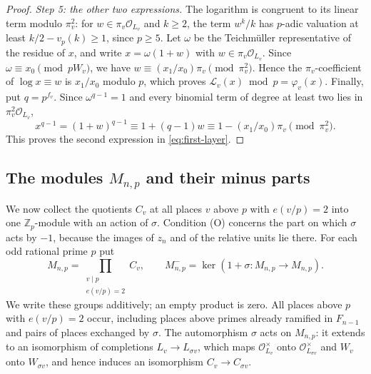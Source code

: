 \documentclass[11pt]{article}
\theoremstyle{plain}
\theoremstyle{definition}
\theoremstyle{remark}
\newcommand{\Z}{\mathbb Z}
\newcommand{\OO}{\mathcal O}
\begin{document}
\begin{proof}
\emph{Step 5: the other two expressions.}  The logarithm is congruent to
its linear term modulo $\pi_v^2$: for $w\in\pi_v\OO_{L_v}$ and $k\ge2$,
the term $w^k/k$ has $p$-adic valuation at least $k/2-v_p(k)\ge1$, since
$p\ge5$.  Let $\omega$ be the Teichm\"uller representative of the residue
of $x$, and write $x=\omega(1+w)$ with $w\in\pi_v\OO_{L_v}$.  Since
$\omega\equiv x_0\pmod{pW_v}$, we have
$w\equiv(x_1/x_0)\pi_v\pmod{\pi_v^2}$.  Hence the $\pi_v$-coefficient of
$\log x\equiv w$ is $x_1/x_0$ modulo $p$, which proves
$\mathcal L_v(x)\bmod p=\varphi_v(x)$.  Finally, put $q=p^{f_v}$.  Since
$\omega^{q-1}=1$ and every binomial term of degree at least two lies in
$\pi_v^2\OO_{L_v}$,
\[
 x^{q-1}=(1+w)^{q-1}\equiv1+(q-1)w\equiv1-(x_1/x_0)\pi_v
 \pmod{\pi_v^2}.
\]
This proves the second expression in \eqref{eq:first-layer}.
\end{proof}

\subsection{The modules \texorpdfstring{$M_{n,p}$}{M(n,p)} and their minus parts}\label{sec:odd-modules}
We now collect the quotients $C_v$ at all places $v$ above $p$ with
$e(v/p)=2$ into one $\Z_p$-module with an action of $\sigma$.  Condition
(O) concerns the part on which $\sigma$ acts by $-1$, because the images
of $z_n$ and of the relative units lie there.  For each odd rational
prime $p$ put
\begin{equation}\label{eq:odd-module}
 M_{n,p}=\prod_{\substack{v\mid p\\e(v/p)=2}}C_v,
 \qquad M_{n,p}^-=\ker(1+\sigma:M_{n,p}\to M_{n,p}).
\end{equation}
We write these groups additively; an empty product is zero.  All
places above $p$ with $e(v/p)=2$ occur, including places above primes already
ramified in $F_{n-1}$ and pairs of places exchanged by $\sigma$.  The
automorphism $\sigma$ acts on $M_{n,p}$: it extends to an isomorphism of
completions $L_v\to L_{\sigma v}$, which maps $\OO_{L_v}^\times$ onto
$\OO_{L_{\sigma v}}^\times$ and $W_v$ onto $W_{\sigma v}$, and hence
induces an isomorphism $C_v\to C_{\sigma v}$.
\end{document}
